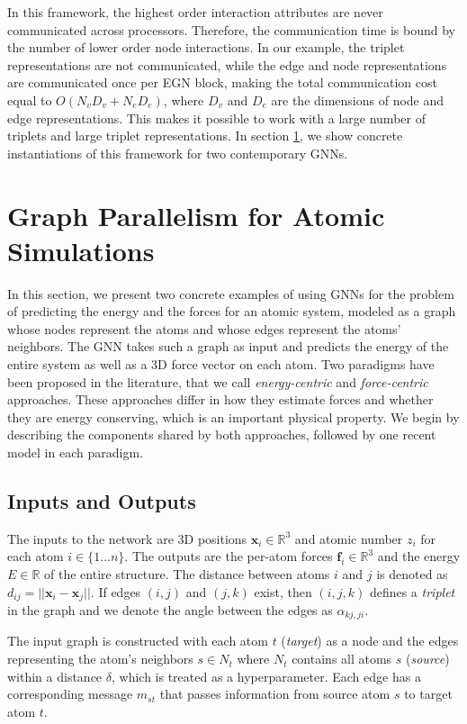 \documentclass{article} \usepackage{iclr2022_conference,times}
\newcommand{\R}{\mathbb{R}}
\newcommand{\xx}{\mathbf{x}}
\newcommand{\ff}{\mathbf{f}}
\begin{document}
In this framework, the highest order interaction attributes are never communicated across processors. Therefore, the communication time is bound by the number of lower order node interactions. In our example, the triplet representations are not communicated, while the edge and node representations are communicated once per EGN block, making the total communication cost equal to $O(N_v D_v + N_e D_e)$, where $D_v$ and $D_e$ are the dimensions of node and edge representations. This makes it possible to work with a large number of triplets and large triplet representations. In section \ref{sec:gp_atoms}, we show concrete instantiations of this framework for two contemporary GNNs.





\section{Graph Parallelism for Atomic Simulations} \label{sec:gp_atoms}

In this section, we present two concrete examples of using GNNs for the problem of predicting the energy and the forces for an atomic system, modeled as a graph whose nodes represent the atoms and whose edges represent the atoms' neighbors. The GNN takes such a graph as input and predicts the energy of the entire system as well as a 3D force vector on each atom. Two paradigms have been proposed in the literature, that we call \emph{energy-centric} and \emph{force-centric} approaches. These approaches differ in how they estimate forces and whether they are energy conserving, which is an important physical property. We begin by describing the components shared by both approaches, followed by one recent model in each paradigm.

\subsection{Inputs and Outputs}

The inputs to the network are 3D positions $\xx_i \in \R^3$ and atomic number $z_i$ for each atom $i \in \{1\ldots n\}$.
The outputs are the per-atom forces $\ff_i \in \R^3$ and the energy $E \in \R$ of the entire structure. The distance between atoms $i$ and $j$ is denoted as $d_{ij} = || \xx_i - \xx_j ||$. If edges $(i, j)$ and $(j, k)$ exist, then $(i, j, k)$ defines a \emph{triplet} in the graph and we denote the angle between the edges as $\alpha_{kj,ji}$.

The input graph is constructed with each atom $t$ (\emph{target}) as a node and the edges representing the atom's neighbors $s \in N_t$ where $N_t$ contains all atoms $s$ (\emph{source}) within a distance $\delta$, which is treated as a hyperparameter. Each edge has a corresponding message $m_{st}$ that passes information from source atom $s$ to target atom $t$.
\end{document}
